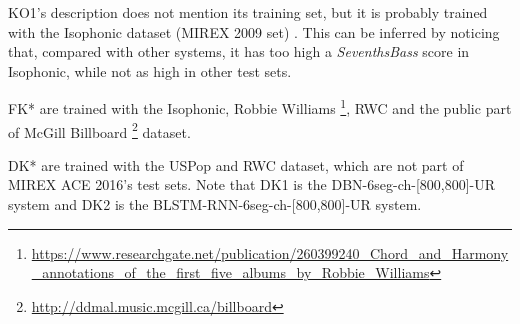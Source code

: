 KO1's description does not mention its training set, but it is probably trained with the Isophonic dataset (MIREX 2009 set) \cite{burgoyne2014comparative}. This can be inferred by noticing that, compared with other systems, it has too high a \textit{SeventhsBass} score in Isophonic, while not as high in other test sets.

FK* are trained with the Isophonic, Robbie Williams \footnote{\url{https://www.researchgate.net/publication/260399240\_Chord\_and\_Harmony\_annotations\_of\_the\_first\_five\_albums\_by\_Robbie\_Williams}}, RWC and the public part of McGill Billboard \footnote{\url{http://ddmal.music.mcgill.ca/billboard}} dataset.

DK* are trained with the USPop and RWC dataset, which are not part of MIREX ACE 2016's test sets. Note that DK1 is the DBN-6seg-ch-[800,800]-UR system and DK2 is the BLSTM-RNN-6seg-ch-[800,800]-UR system.

